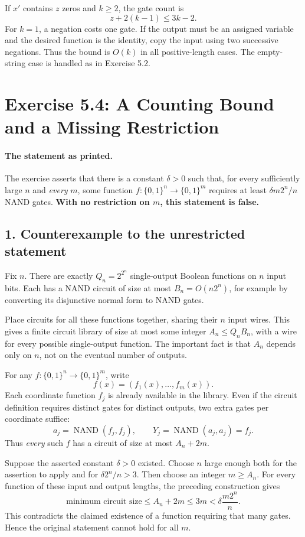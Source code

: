 \documentclass[UTF8,fontset=fandol,11pt,a4paper]{ctexart}
\newcommand{\bits}{\{0,1\}}
\newcommand{\NAND}{\operatorname{NAND}}
\begin{document}
If $x'$ contains $z$ zeros and $k\ge2$, the gate count is
\[
 z+2(k-1)\le3k-2.
\]
For $k=1$, a negation costs one gate. If the output must be an
assigned variable and the desired function is the identity, copy
the input using two successive negations. Thus the bound is $O(k)$
in all positive-length cases. The empty-string case is handled as
in Exercise 5.2.

\section{Exercise 5.4: A Counting Bound and a Missing Restriction}

\paragraph{The statement as printed.}
The exercise asserts that there is a constant $\delta>0$ such that,
for every sufficiently large $n$ and \emph{every} $m$, some function
$f:\bits^n\to\bits^m$ requires at least $\delta m2^n/n$ NAND gates.
\textbf{With no restriction on $m$, this statement is false.}

\subsection*{1. Counterexample to the unrestricted statement}
Fix $n$. There are exactly $Q_n=2^{2^n}$ single-output Boolean
functions on $n$ input bits. Each has a NAND circuit of size at most
$B_n=O(n2^n)$, for example by converting its disjunctive normal form
to NAND gates.

Place circuits for all these functions together, sharing their
$n$ input wires. This gives a finite circuit library of size at most
some integer $A_n\le Q_nB_n$, with a wire for every possible
single-output function. The important fact is that $A_n$ depends
only on $n$, not on the eventual number of outputs.

For any $f:\bits^n\to\bits^m$, write
\[
 f(x)=(f_1(x),\ldots,f_m(x)).
\]
Each coordinate function $f_j$ is already available in the library.
Even if the circuit definition requires distinct gates for distinct
outputs, two extra gates per coordinate suffice:
\[
 a_j=\NAND(f_j,f_j),\qquad Y_j=\NAND(a_j,a_j)=f_j.
\]
Thus \emph{every} such $f$ has a circuit of size at most $A_n+2m$.

Suppose the asserted constant $\delta>0$ existed. Choose $n$ large
enough both for the assertion to apply and for $\delta2^n/n>3$.
Then choose an integer $m\ge A_n$. For every function of these
input and output lengths, the preceding construction gives
\[
 \text{minimum circuit size}\le A_n+2m\le3m
 <\delta\frac{m2^n}{n}.
\]
This contradicts the claimed existence of a function requiring that
many gates. Hence the original statement cannot hold for all $m$.
\end{document}

